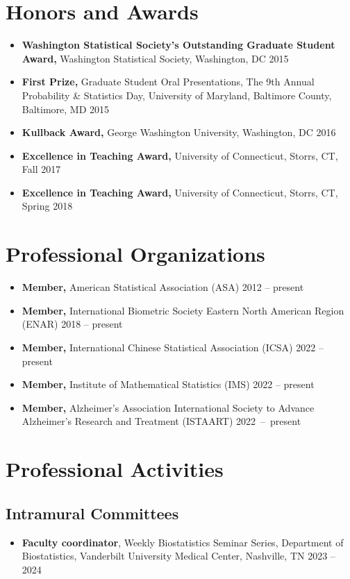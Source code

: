 \documentclass[12pt]{article}
\begin{document}
	\section*{Honors and Awards}
	\begin{itemize}
		\item {\bf Washington Statistical Society's Outstanding Graduate Student Award,} Washington Statistical Society, Washington, DC \hfill 2015
		\item {\bf First Prize,} Graduate Student Oral Presentations, The 9th Annual Probability \& Statistics Day,  University of Maryland, Baltimore County, Baltimore, MD \hfill 2015
		\item {\bf Kullback Award,} George Washington University, Washington, DC \hfill 2016
		\item {\bf Excellence in Teaching Award,} University of Connecticut, Storrs, CT, \hfill Fall 2017
		\item {\bf Excellence in Teaching Award,} University of Connecticut, Storrs, CT, \hfill Spring 2018
	\end{itemize}
		
	\section*{Professional Organizations}
	\begin{itemize}
		\item {\bf Member,} American Statistical Association (ASA) \hfill 2012 -- present
		\item {\bf Member,} International Biometric Society Eastern North American Region (ENAR) \hfill 2018 -- present
		\item {\bf Member,} International Chinese Statistical Association (ICSA) \hfill 2022 -- present
		\item {\bf Member,} Institute of Mathematical Statistics (IMS) \hfill 2022 -- present
		\item {\bf Member,} Alzheimer's Association International 
		Society to Advance Alzheimer's Research and Treatment 
		(ISTAART) \hfill \mbox{2022 -- present}
	\end{itemize}

	\section*{Professional Activities}
	
	\subsection*{Intramural Committees}
	\begin{itemize}
		\item {\bf Faculty coordinator}, Weekly Biostatistics 
		Seminar Series, Department of Biostatistics, Vanderbilt 
		University Medical Center, Nashville, TN \hfill 2023 -- 2024
	\end{itemize}
	
\end{document}
